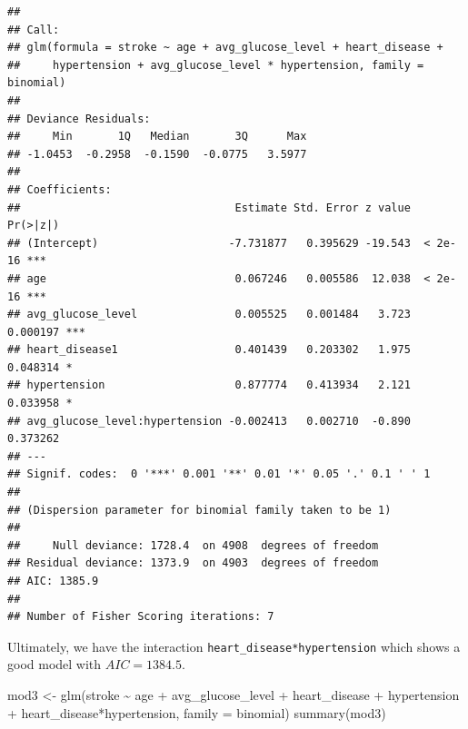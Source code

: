 \documentclass[
]{article}
\newenvironment{Shaded}{\begin{snugshade}}{\end{snugshade}}
\newcommand{\AttributeTok}[1]{\textcolor[rgb]{0.77,0.63,0.00}{#1}}
\newcommand{\FunctionTok}[1]{\textcolor[rgb]{0.00,0.00,0.00}{#1}}
\newcommand{\NormalTok}[1]{#1}
\newcommand{\OtherTok}[1]{\textcolor[rgb]{0.56,0.35,0.01}{#1}}
\newcommand{\SpecialCharTok}[1]{\textcolor[rgb]{0.00,0.00,0.00}{#1}}
\begin{document}
\begin{verbatim}
## 
## Call:
## glm(formula = stroke ~ age + avg_glucose_level + heart_disease + 
##     hypertension + avg_glucose_level * hypertension, family = binomial)
## 
## Deviance Residuals: 
##     Min       1Q   Median       3Q      Max  
## -1.0453  -0.2958  -0.1590  -0.0775   3.5977  
## 
## Coefficients:
##                                 Estimate Std. Error z value Pr(>|z|)    
## (Intercept)                    -7.731877   0.395629 -19.543  < 2e-16 ***
## age                             0.067246   0.005586  12.038  < 2e-16 ***
## avg_glucose_level               0.005525   0.001484   3.723 0.000197 ***
## heart_disease1                  0.401439   0.203302   1.975 0.048314 *  
## hypertension                    0.877774   0.413934   2.121 0.033958 *  
## avg_glucose_level:hypertension -0.002413   0.002710  -0.890 0.373262    
## ---
## Signif. codes:  0 '***' 0.001 '**' 0.01 '*' 0.05 '.' 0.1 ' ' 1
## 
## (Dispersion parameter for binomial family taken to be 1)
## 
##     Null deviance: 1728.4  on 4908  degrees of freedom
## Residual deviance: 1373.9  on 4903  degrees of freedom
## AIC: 1385.9
## 
## Number of Fisher Scoring iterations: 7
\end{verbatim}

Ultimately, we have the interaction \texttt{heart\_disease*hypertension}
which shows a good model with \(AIC = 1384.5\).

\begin{Shaded}
\begin{Highlighting}[]
\NormalTok{mod3 }\OtherTok{\textless{}{-}} \FunctionTok{glm}\NormalTok{(stroke }\SpecialCharTok{\textasciitilde{}}\NormalTok{ age }\SpecialCharTok{+}\NormalTok{ avg\_glucose\_level }\SpecialCharTok{+}\NormalTok{ heart\_disease }\SpecialCharTok{+}\NormalTok{ hypertension }\SpecialCharTok{+} 
\NormalTok{            heart\_disease}\SpecialCharTok{*}\NormalTok{hypertension, }\AttributeTok{family =}\NormalTok{ binomial)}
\FunctionTok{summary}\NormalTok{(mod3)}
\end{Highlighting}
\end{Shaded}
\end{document}
